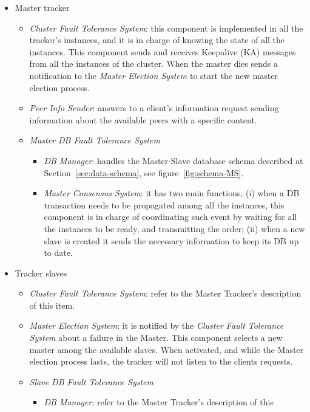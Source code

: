\documentclass[twoside,a4paper,10pt]{article}
\begin{document}
\begin{itemize}
\item Master tracker
  \begin{itemize}
  \item \emph{Cluster Fault Tolerance System}: this component is implemented
    in all the tracker's instances, and it is in charge of knowing the state
    of all the instances. This component sends and receives Keepalive (KA)
    messages from all the instances of the cluster.
    When the master dies sends a
    notification to the \emph{Master Election System} to start the new master
    election process.
  \item \emph{Peer Info Sender}: answers to a client's information request 
    sending
    information about the available peers with a specific content.
  \item \emph{Master DB Fault Tolerance System}
    \begin{itemize}
    \item \emph{DB Manager}: handles the Master-Slave database schema described
      at Section~\ref{sec:data-schema}, see figure~\ref{fig:schema-MS}.
    \item \emph{Master Consensus System}: it has two main functions, (i) when a
      DB transaction needs to be propagated among all the instances,
      this component is in charge of coordinating such event by waiting for all
      the instances to be ready, and transmitting the order; (ii) when a
      new slave is created it sends the necessary information to keep its
      DB up to date.
    \end{itemize}
  \end{itemize}
\item Tracker slaves
  \begin{itemize}
  \item \emph{Cluster Fault Tolerance System}: refer to the Master Tracker's
    description of this item.
  \item \emph{Master Election System}: it is notified by the
    \emph{Cluster Fault Tolerance System} about a failure in the Master. This
    component selects a new master among the available slaves. When activated,
    and while the Master election process lasts, the tracker will not listen to
    the clients requests.
  \item \emph{Slave DB Fault Tolerance System}
    \begin{itemize}
    \item \emph{DB Manager}: refer to the Master Tracker's description of this

\end{itemize}
\end{itemize}
\end{itemize}
\end{document}

